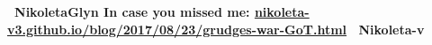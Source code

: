 \documentclass[usenames,dvipsnames,t]{beamer}
\begin{document}
\begin{frame}[fragile]
\begin{columns}
\begin{column}{.8\linewidth}
   \hspace{1cm}

\textbf{ \faTwitter \ NikoletaGlyn \hspace{2cm} In case you missed me: \url{nikoleta-v3.github.io/blog/2017/08/23/grudges-war-GoT.html} \hspace{2cm} \faGithub \ Nikoleta-v}

\end{column}
\end{columns}

   \vspace{1cm}

\end{frame}
\end{document}
